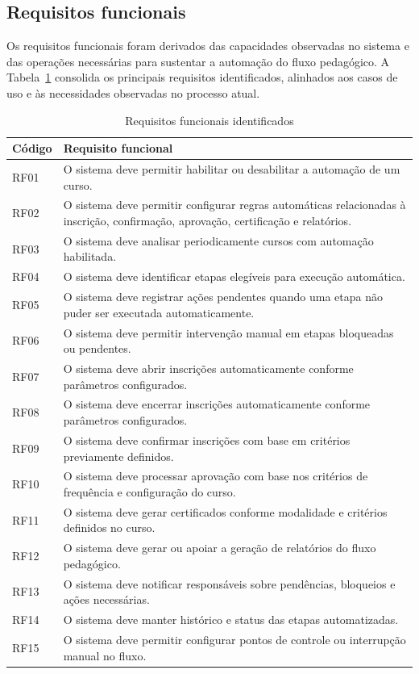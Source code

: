 \subsection{Requisitos funcionais}
\label{sec:metod:requisitos:funcionais}

Os requisitos funcionais foram derivados das capacidades observadas no
sistema e das operações necessárias para sustentar a automação do fluxo
pedagógico. A Tabela~\ref{tab:requisitos-funcionais-levantamento}
consolida os principais requisitos identificados, alinhados aos casos de
uso e às necessidades observadas no processo atual.

\begin{table}[H]
\centering
\caption{Requisitos funcionais identificados}
\label{tab:requisitos-funcionais-levantamento}
\begin{tabular}{p{2cm} p{11cm}}
\hline
\textbf{Código} & \textbf{Requisito funcional} \\
\hline
RF01 & O sistema deve permitir habilitar ou desabilitar a automação de um curso. \\
\hline
RF02 & O sistema deve permitir configurar regras automáticas relacionadas à inscrição, confirmação, aprovação, certificação e relatórios. \\
\hline
RF03 & O sistema deve analisar periodicamente cursos com automação habilitada. \\
\hline
RF04 & O sistema deve identificar etapas elegíveis para execução automática. \\
\hline
RF05 & O sistema deve registrar ações pendentes quando uma etapa não puder ser executada automaticamente. \\
\hline
RF06 & O sistema deve permitir intervenção manual em etapas bloqueadas ou pendentes. \\
\hline
RF07 & O sistema deve abrir inscrições automaticamente conforme parâmetros configurados. \\
\hline
RF08 & O sistema deve encerrar inscrições automaticamente conforme parâmetros configurados. \\
\hline
RF09 & O sistema deve confirmar inscrições com base em critérios previamente definidos. \\
\hline
RF10 & O sistema deve processar aprovação com base nos critérios de frequência e configuração do curso. \\
\hline
RF11 & O sistema deve gerar certificados conforme modalidade e critérios definidos no curso. \\
\hline
RF12 & O sistema deve gerar ou apoiar a geração de relatórios do fluxo pedagógico. \\
\hline
RF13 & O sistema deve notificar responsáveis sobre pendências, bloqueios e ações necessárias. \\
\hline
RF14 & O sistema deve manter histórico e status das etapas automatizadas. \\
\hline
RF15 & O sistema deve permitir configurar pontos de controle ou interrupção manual no fluxo. \\
\hline
\end{tabular}
\end{table}

